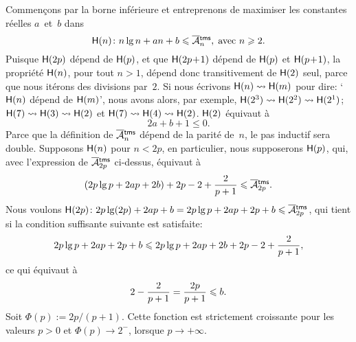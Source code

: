 Commençons par la borne inférieure et entreprenons de maximiser les
constantes réelles \(a\)~et~\(b\) dans
\begin{equation*}
\abovedisplayskip=0pt
\belowdisplayskip=2pt
\pred{H}{n} \colon n\lg n + an + b \leqslant \OM{\fun{tms}}{n},
\; \text{avec \(n \geqslant 2\).}
\end{equation*}
Puisque \(\textsf{H}({2p})\) dépend de \(\textsf{H}({p})\), et que
\(\textsf{H}({2p\!+\!1})\) dépend de \(\textsf{H}({p})\) et
\(\textsf{H}({p\!+\!1})\), la propriété \(\textsf{H}({n})\), pour tout
\(n>1\), dépend donc transitivement de \(\textsf{H}({2})\) seul, parce que
nous itérons des divisions par~\(2\). Si nous écrivons \(\textsf{H}({n})
\leadsto \textsf{H}({m})\) pour dire: `\(\textsf{H}({n})\) dépend de
\(\textsf{H}({m})\)', nous avons alors, par exemple, \(\textsf{H}({2^3})
\leadsto \textsf{H}({2^2}) \leadsto \textsf{H}({2^1})\); \(\textsf{H}({7})
\leadsto \textsf{H}({3}) \leadsto \textsf{H}({2})\) et \(\textsf{H}({7}) \leadsto
\textsf{H}({4}) \leadsto \textsf{H}({2})\). \(\textsf{H}({2})\) équivaut à
\begin{equation}
2a + b + 1 \leqslant 0.
\label{ineq:base_lower_Atms}
\end{equation}
Parce que la définition de \(\OM{\fun{tms}}{n}\) dépend de la parité
de~\(n\), le pas inductif sera double. Supposons
\(\textsf{H}({n})\) pour \(n < 2p\), en particulier, nous supposerons
\(\textsf{H}({p})\), qui, avec l'expression de \(\OM{\fun{tms}}{2p}\)
ci-dessus, équivaut à
\begin{equation*}
\abovedisplayskip=2pt
\belowdisplayskip=2pt
 (2p\lg p + 2ap + 2b) + 2p - 2 + \frac{2}{p+1} \leqslant \OM{\fun{tms}}{2p}.
\end{equation*}
Nous voulons \(\pred{H}{2p} \colon 2p\lg(2p) + 2ap + b
= 2p\lg p + 2ap + 2p + b \leqslant \OM{\fun{tms}}{2p}\), qui tient si
la condition suffisante suivante est satisfaite:
\begin{equation*}
\abovedisplayskip=0pt
\belowdisplayskip=2pt
2p\lg p + 2ap + 2p + b \leqslant 2p\lg p + 2ap + 2b + 2p - 2 + \frac{2}{p+1},
\end{equation*}
ce qui équivaut à
\begin{equation*}
\abovedisplayskip=0pt
\belowdisplayskip=2pt
2 - \frac{2}{p+1} = \frac{2p}{p+1} \leqslant b.
\end{equation*}
Soit \(\Phi(p) := 2p/(p+1)\). Cette fonction est strictement
croissante pour les valeurs \(p > 0\) et \(\Phi(p) \rightarrow
2^{-}\), lorsque \(p \rightarrow +\infty\).

